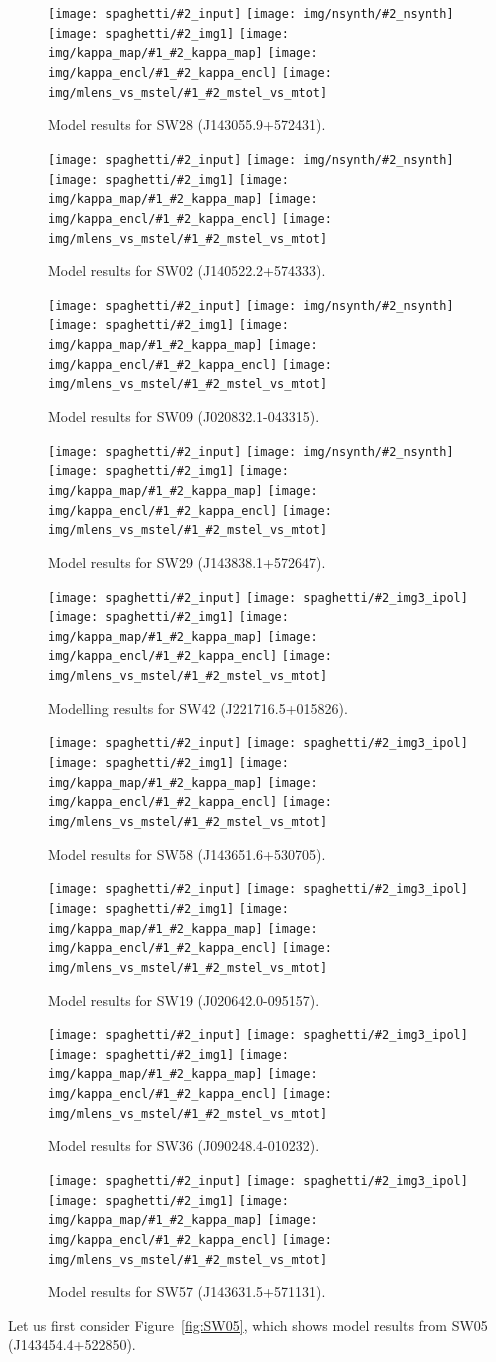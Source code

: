 \documentclass[fleqn,usenatbib]{mnras}
\newcommand{\inclfig}[2]{
  \centering
	\texttt{[image: spaghetti/\#2\_input]}%
	\texttt{[image: spaghetti/\#2\_img3\_ipol]}
	\texttt{[image: spaghetti/\#2\_img1]}%
        \texttt{[image: img/kappa\_map/\#1\_\#2\_kappa\_map]}
	\texttt{[image: img/kappa\_encl/\#1\_\#2\_kappa\_encl]}%
	\texttt{[image: img/mlens\_vs\_mstel/\#1\_\#2\_mstel\_vs\_mtot]}
}
\newcommand{\inclfign}[2]{
  \centering
	\texttt{[image: spaghetti/\#2\_input]}%
	\texttt{[image: img/nsynth/\#2\_nsynth]}
	\texttt{[image: spaghetti/\#2\_img1]}%
        \texttt{[image: img/kappa\_map/\#1\_\#2\_kappa\_map]}
	\texttt{[image: img/kappa\_encl/\#1\_\#2\_kappa\_encl]}%
	\texttt{[image: img/mlens\_vs\_mstel/\#1\_\#2\_mstel\_vs\_mtot]}
}
\newcommand{\figref}[1]{\ref{fig:#1}}
\begin{document}
\begin{figure}
  \inclfign{SW28}{ASW0007xrs_JHC3J2HYV7}
  \caption{Model results for SW28 (J143055.9+572431).}
  \label{fig:SW28}
\end{figure}

\begin{figure}
  \inclfign{SW02}{ASW000619d_011489}
  \caption{Model results for SW02 (J140522.2+574333).}
  \label{fig:SW02}
\end{figure}

\begin{figure}
  \inclfign{SW09}{ASW0002asp_5EKMWWVJHL}
  \caption{Model results for SW09 (J020832.1-043315).}
  \label{fig:SW09}
\end{figure}

\begin{figure}
  \inclfign{SW29}{ASW0008qsm_TOFS7JNGEK}
  \caption{Model results for SW29 (J143838.1+572647).}
  \label{fig:SW29}
\end{figure}

\begin{figure}
  \inclfig{SW42}{ASW00096rm_4Q3YCEWGLN}
  \caption{Modelling results for SW42 (J221716.5+015826).}
  \label{fig:SW42}
\end{figure}

\begin{figure}
  \inclfig{SW58}{ASW0007iwp_4XBJWT3COV}
  \caption{Model results for SW58 (J143651.6+530705).}
  \label{fig:SW58}
\end{figure}

\begin{figure}
  \inclfig{SW19}{ASW0001ld7_OS3CYAKLRT}
  \caption{Model results for SW19 (J020642.0-095157).}
  \label{fig:SW19}
\end{figure}


\begin{figure}
  \inclfig{SW36}{ASW000096t_7IPP7LWVOF}
  \caption{Model results for SW36 (J090248.4-010232).}
  \label{fig:SW36}
\end{figure}

\begin{figure}
  \inclfig{SW57}{ASW0008pag_5SXGXQYY6V}
  \caption{Model results for SW57 (J143631.5+571131).}
  \label{fig:SW57}
\end{figure}

Let us first consider Figure~\figref{SW05}, which shows model results
from SW05 (J143454.4+522850).
\end{document}
